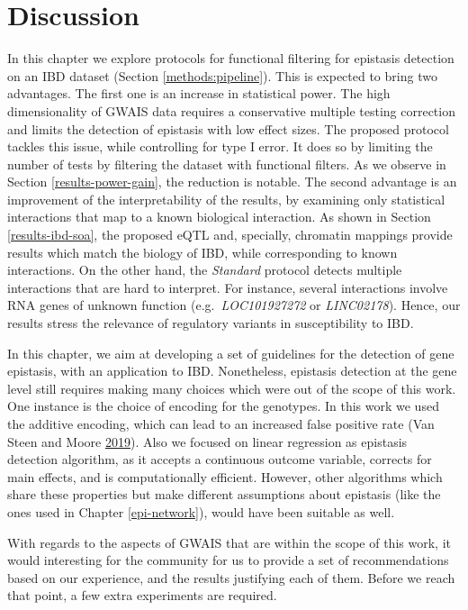 \documentclass[
  11pt,
]{env/yjiao}
\begin{document}
\hypertarget{discussion}{%
\section{Discussion}\label{discussion}}

In this chapter we explore protocols for functional filtering for
epistasis detection on an IBD dataset (Section
\ref{methods:pipeline}). This is expected to bring two
advantages. The first one is an increase in statistical power.
The high dimensionality of GWAIS data requires a conservative
multiple testing correction and limits the detection of epistasis with low effect
sizes. The proposed protocol tackles this issue, while controlling for
type I error. It does so by limiting the number of tests by filtering
the dataset with functional filters. As we observe in Section
\ref{results-power-gain}, the reduction is notable. The second advantage is an
improvement of the interpretability of the results, by examining only
statistical interactions that map to a known biological interaction. As shown
in Section \ref{results-ibd-soa}, the proposed eQTL and, specially, chromatin
mappings provide results which match the biology of IBD, while corresponding
to known interactions. On the other hand, the \emph{Standard} protocol detects
multiple interactions that are hard to interpret. For instance, several
interactions involve RNA genes of unknown function (e.g.~\emph{LOC101927272} or
\emph{LINC02178}). Hence, our results stress the relevance of regulatory variants
in susceptibility to IBD.

In this chapter, we aim at developing a set of guidelines for the detection of
gene epistasis, with an application to IBD. Nonetheless, epistasis detection
at the gene level still requires making many
choices which were out of the scope of this work. One instance is the
choice of encoding for the genotypes. In this work we used the additive
encoding, which can lead to an increased false positive rate
(Van Steen and Moore \protect\hyperlink{ref-van2019increase}{2019}). Also we focused on linear regression as epistasis
detection algorithm, as it accepts a continuous outcome variable,
corrects for main effects, and is computationally efficient. However,
other algorithms which share these properties but make different
assumptions about epistasis (like the ones used in Chapter \ref{epi-network}),
would have been suitable as well.

With regards to the aspects of GWAIS that are within the scope of this work,
it would interesting for the community for us
to provide a set of recommendations based on our experience, and the results
justifying each of them. Before we reach that point, a few extra experiments
are required.
\end{document}
